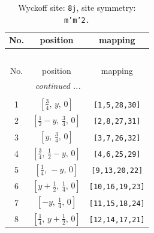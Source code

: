 \documentclass[fleqn,8pt]{jsarticle}
\begin{document}
\begin{longtable}{ccc}
\caption{Wyckoff site: {\tt 8j}, site symmetry: {\tt m'm'2.}}
 \\
 \hline \hline
No. & position & mapping \\ \hline \endfirsthead

\multicolumn{2}{l}{\tablename\ \thetable{}} \\
 \hline \hline
No. & position & mapping \\ \hline \endhead

 \hline \hline
\multicolumn{2}{r}{\footnotesize\it continued ...} \\ \endfoot

 \hline \hline
\multicolumn{2}{r}{} \\ \endlastfoot

1 & $\left[ \frac{3}{4},\, y,\, 0 \right]$ & {\tt [1,5,28,30]} \\ \hline
2 & $\left[ \frac{1}{2} - y,\, \frac{3}{4},\, 0 \right]$ & {\tt [2,8,27,31]} \\ \hline
3 & $\left[ y,\, \frac{3}{4},\, 0 \right]$ & {\tt [3,7,26,32]} \\ \hline
4 & $\left[ \frac{3}{4},\, \frac{1}{2} - y,\, 0 \right]$ & {\tt [4,6,25,29]} \\ \hline
5 & $\left[ \frac{1}{4},\, - y,\, 0 \right]$ & {\tt [9,13,20,22]} \\ \hline
6 & $\left[ y + \frac{1}{2},\, \frac{1}{4},\, 0 \right]$ & {\tt [10,16,19,23]} \\ \hline
7 & $\left[ - y,\, \frac{1}{4},\, 0 \right]$ & {\tt [11,15,18,24]} \\ \hline
8 & $\left[ \frac{1}{4},\, y + \frac{1}{2},\, 0 \right]$ & {\tt [12,14,17,21]} \\
\end{longtable}
\renewcommand{\arraystretch}{1.2}
\end{document}
